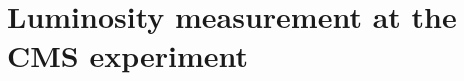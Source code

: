 \chapter{Luminosity measurement at the CMS experiment}  %

\ifpdf
    \graphicspath{{Chapter2/Figs/Raster/}{Chapter2/Figs/PDF/}{Chapter2/Figs/}}
\else
    \graphicspath{{Chapter2/Figs/Vector/}{Chapter2/Figs/}}
\fi




